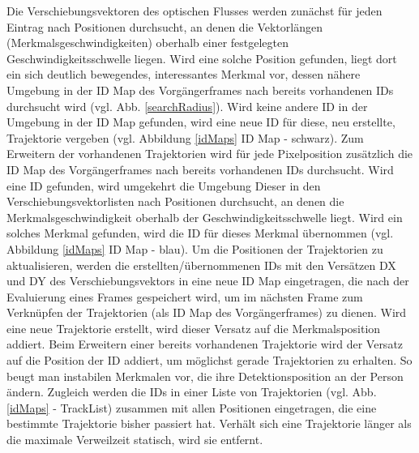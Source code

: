 Die Verschiebungsvektoren des optischen Flusses werden zunächst für jeden Eintrag nach Positionen durchsucht, an denen die Vektorlängen (Merkmalsgeschwindigkeiten) oberhalb einer festgelegten Geschwindigkeitsschwelle liegen. Wird eine solche Position gefunden, liegt dort ein sich deutlich bewegendes, interessantes Merkmal vor, dessen nähere Umgebung in der ID Map des Vorgängerframes nach bereits vorhandenen IDs durchsucht wird (vgl. Abb. \ref{searchRadius}). Wird keine andere ID in der Umgebung in der ID Map gefunden, wird eine neue ID für diese, neu erstellte, Trajektorie vergeben (vgl. Abbildung \ref{idMaps} ID Map - schwarz). Zum Erweitern der vorhandenen Trajektorien wird für jede Pixelposition zusätzlich die ID Map des Vorgängerframes nach bereits vorhandenen IDs durchsucht.
\newpage
Wird eine ID gefunden, wird umgekehrt die Umgebung Dieser in den Verschiebungsvektorlisten nach Positionen durchsucht, an denen die Merkmalsgeschwindigkeit oberhalb der Geschwindigkeitsschwelle liegt. Wird ein solches Merkmal gefunden, wird die ID für dieses Merkmal übernommen (vgl. Abbildung \ref{idMaps} ID Map - blau). Um die Positionen der Trajektorien zu aktualisieren, werden die erstellten/übernommenen IDs mit den Versätzen DX und DY des Verschiebungsvektors in eine neue ID Map eingetragen, die nach der Evaluierung eines Frames gespeichert wird, um im nächsten Frame zum Verknüpfen der Trajektorien (als ID Map des Vorgängerframes) zu dienen. Wird eine neue Trajektorie erstellt, wird dieser Versatz auf die Merkmalsposition addiert. Beim Erweitern einer bereits vorhandenen Trajektorie wird der Versatz auf die Position der ID addiert, um möglichst gerade Trajektorien zu erhalten. So beugt man instabilen Merkmalen vor, die ihre Detektionsposition an der Person ändern. Zugleich werden die IDs in einer Liste von Trajektorien (vgl. Abb. \ref{idMaps} - TrackList) zusammen mit allen Positionen eingetragen, die eine bestimmte Trajektorie bisher passiert hat. Verhält sich eine Trajektorie länger als die maximale Verweilzeit statisch, wird sie entfernt. 
\bigskip
\bigskip
